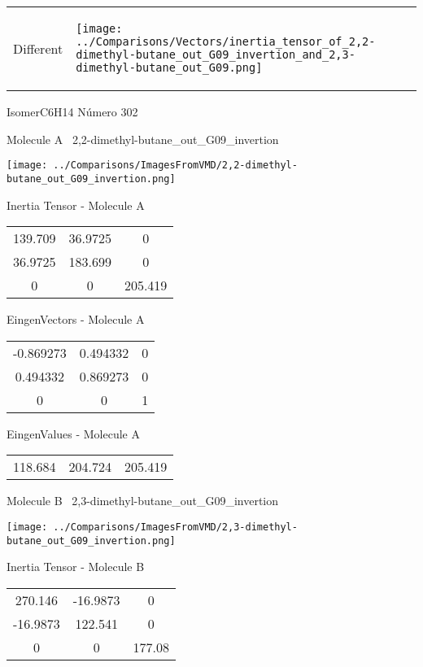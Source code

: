 \vtab[-5mm]
\begin{tabular}{*{2}{m{}}}
\begin{center}
\textcolor{NavyBlue}{\Large Different}
\end{center}
&
\begin{center}
\texttt{[image: ../Comparisons/Vectors/inertia\_tensor\_of\_2,2-dimethyl-butane\_out\_G09\_invertion\_and\_2,3-dimethyl-butane\_out\_G09.png]}
\end{center}
\end{tabular}

 \newpage

\vtab[-3cm]
\begin{center}
{\large IsomerC6H14 \tab Número 302}
\end{center}
\begin{multicols}{2}
\begin{center}

Molecule A \
2,2-dimethyl-butane\_out\_G09\_invertion

\texttt{[image: ../Comparisons/ImagesFromVMD/2,2-dimethyl-butane\_out\_G09\_invertion.png]}

Inertia Tensor - Molecule A \\
\begin{tabular}{|c c c|}
139.709	 & 	36.9725	 & 	0	 \\
36.9725	 & 	183.699	 & 	0	 \\
0	 & 	0	 & 	205.419
\end{tabular}

\vtab
 EingenVectors - Molecule A     \\
\begin{tabular}{|c c c|}
-0.869273	 & 	0.494332	 & 	0	 \\
0.494332	 & 	0.869273	 & 	0	 \\
0	 & 	0	 & 	1
\end{tabular}

\vtab
 EingenValues - Molecule A     \\
\begin{tabular}{|c c c|}
118.684	 & 	204.724	 & 	205.419	 \\
\end{tabular}
\columnbreak

Molecule B \
2,3-dimethyl-butane\_out\_G09\_invertion

\texttt{[image: ../Comparisons/ImagesFromVMD/2,3-dimethyl-butane\_out\_G09\_invertion.png]}

Inertia Tensor - Molecule B \\
\begin{tabular}{|c c c|}
270.146	 & 	-16.9873	 & 	0	 \\
-16.9873	 & 	122.541	 & 	0	 \\
0	 & 	0	 & 	177.08
\end{tabular}


\end{center}
\end{multicols}
